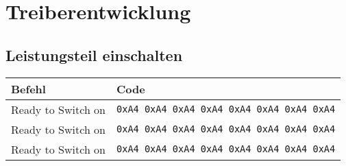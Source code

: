
\section{Treiberentwicklung}
\label{sec:Treiber}

\subsection{Leistungsteil einschalten}
\begin{table}[H]
    \begin{tabularx}{\textwidth}{@{}Xl@{}} \toprule
    Befehl & Code \\
    \midrule

    Ready to Switch on  &
    \lstinline{0xA4 0xA4 0xA4 0xA4 0xA4 0xA4 0xA4 0xA4} \\

    Ready to Switch on  &
    \lstinline{0xA4 0xA4 0xA4 0xA4 0xA4 0xA4 0xA4 0xA4} \\

    Ready to Switch on  &
    \lstinline{0xA4 0xA4 0xA4 0xA4 0xA4 0xA4 0xA4 0xA4} \\

    \bottomrule
    \end{tabularx}
\end{table}
